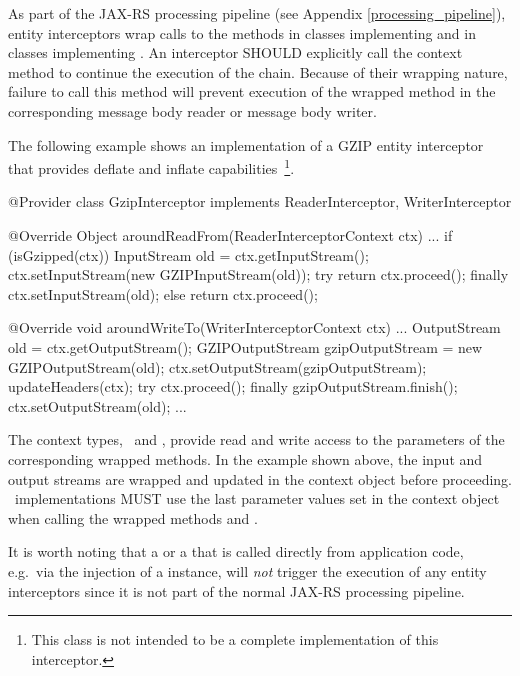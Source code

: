 As part of the JAX-RS processing pipeline (see Appendix \ref{processing_pipeline}), entity interceptors wrap calls to the methods  in classes implementing  and  in classes implementing . An interceptor SHOULD explicitly call the context method  to continue the execution of the chain. Because of their wrapping nature, failure to call this method will prevent execution of the wrapped method in the corresponding message body reader or message body writer.

The following example shows an implementation of a GZIP entity interceptor that provides deflate and inflate capabilities~\footnote{This class is not intended to be a complete implementation of this interceptor.}.

\begin{listing}{1}
@Provider
class GzipInterceptor implements ReaderInterceptor, WriterInterceptor {

    @Override
    Object aroundReadFrom(ReaderInterceptorContext ctx) ... {
        if (isGzipped(ctx)) {
            InputStream old = ctx.getInputStream();
            ctx.setInputStream(new GZIPInputStream(old));
            try {
                return ctx.proceed();
            } finally {
                ctx.setInputStream(old);
            }
        } else {
            return ctx.proceed();
        }
    }

    @Override
    void aroundWriteTo(WriterInterceptorContext ctx) ... {
        OutputStream old = ctx.getOutputStream();
        GZIPOutputStream gzipOutputStream = new GZIPOutputStream(old);
        ctx.setOutputStream(gzipOutputStream);
        updateHeaders(ctx);
        try {
            ctx.proceed();
        } finally {
            gzipOutputStream.finish();
            ctx.setOutputStream(old);
        }
    }
    ...
}
\end{listing}

The context types, \ReaderInterceptorContext\ and \WriterInterceptorContext, provide read and write access to the parameters of the corresponding wrapped methods. In the example shown above, the input and output streams are wrapped and updated in the context object before proceeding. \jaxrs\ implementations MUST use the last parameter values set in the context object when calling the wrapped methods  and .

It is worth noting that a  or a  that is called directly from application code, e.g.~via the injection of a  instance, will \emph{not} trigger the execution of any entity interceptors since it is not part of the normal JAX-RS processing pipeline. 

